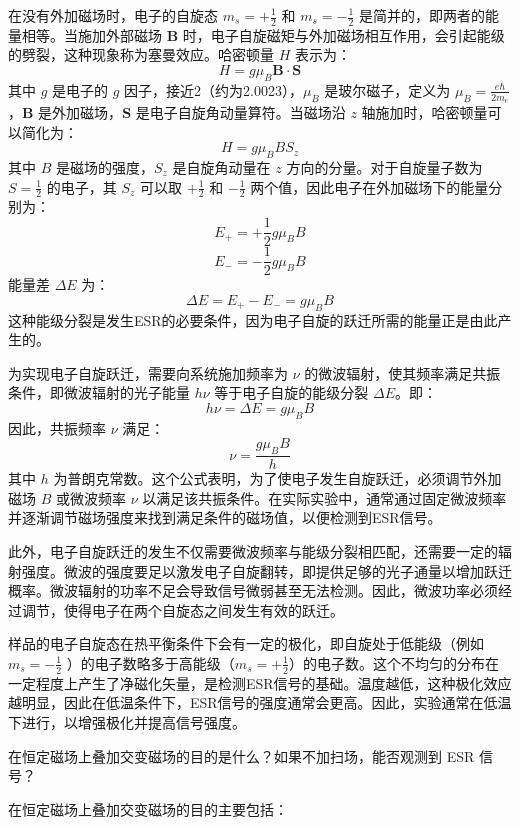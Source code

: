 \documentclass[dvipsnames, svgnames,a4paper,11pt]{article}
\begin{document}
在没有外加磁场时，电子的自旋态 \( m_s = +\frac{1}{2} \) 和 \( m_s = -\frac{1}{2} \) 是简并的，即两者的能量相等。当施加外部磁场 \( \mathbf{B} \) 时，电子自旋磁矩与外加磁场相互作用，会引起能级的劈裂，这种现象称为塞曼效应。哈密顿量 \( H \) 表示为：\[ H = g \mu_B \mathbf{B} \cdot \mathbf{S} \]其中 \( g \) 是电子的 \( g \) 因子，接近2（约为2.0023），\( \mu_B \) 是玻尔磁子，定义为 \( \mu_B = \frac{e \hbar}{2m_e} \)，\( \mathbf{B} \) 是外加磁场，\( \mathbf{S} \) 是电子自旋角动量算符。当磁场沿 \( z \) 轴施加时，哈密顿量可以简化为：\[ H = g \mu_B B S_z \]其中 \( B \) 是磁场的强度，\( S_z \) 是自旋角动量在 \( z \) 方向的分量。对于自旋量子数为 \( S = \frac{1}{2} \) 的电子，其 \( S_z \) 可以取 \( +\frac{1}{2} \) 和 \( -\frac{1}{2} \) 两个值，因此电子在外加磁场下的能量分别为：\[ E_{+} = +\frac{1}{2} g \mu_B B \] \[ E_{-} = -\frac{1}{2} g \mu_B B \]能量差 \( \Delta E \) 为：\[ \Delta E = E_{+} - E_{-} = g \mu_B B \]这种能级分裂是发生ESR的必要条件，因为电子自旋的跃迁所需的能量正是由此产生的。

为实现电子自旋跃迁，需要向系统施加频率为 \( \nu \) 的微波辐射，使其频率满足共振条件，即微波辐射的光子能量 \( h \nu \) 等于电子自旋的能级分裂 \( \Delta E \)。即：\[ h \nu = \Delta E = g \mu_B B \]因此，共振频率 \( \nu \) 满足：\[ \nu = \frac{g \mu_B B}{h} \]其中 \( h \) 为普朗克常数。这个公式表明，为了使电子发生自旋跃迁，必须调节外加磁场 \( B \) 或微波频率 \( \nu \) 以满足该共振条件。在实际实验中，通常通过固定微波频率并逐渐调节磁场强度来找到满足条件的磁场值，以便检测到ESR信号。

此外，电子自旋跃迁的发生不仅需要微波频率与能级分裂相匹配，还需要一定的辐射强度。微波的强度要足以激发电子自旋翻转，即提供足够的光子通量以增加跃迁概率。微波辐射的功率不足会导致信号微弱甚至无法检测。因此，微波功率必须经过调节，使得电子在两个自旋态之间发生有效的跃迁。

样品的电子自旋态在热平衡条件下会有一定的极化，即自旋处于低能级（例如 \( m_s = -\frac{1}{2} \) ）的电子数略多于高能级（\( m_s = +\frac{1}{2} \)）的电子数。这个不均匀的分布在一定程度上产生了净磁化矢量，是检测ESR信号的基础。温度越低，这种极化效应越明显，因此在低温条件下，ESR信号的强度通常会更高。因此，实验通常在低温下进行，以增强极化并提高信号强度。

	




\begin{question}
	在恒定磁场上叠加交变磁场的目的是什么？如果不加扫场，能否观测到 ESR 信号？
\end{question}

在恒定磁场上叠加交变磁场的目的主要包括：
\end{document}
